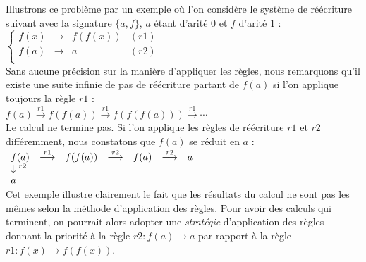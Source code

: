 Illustrons ce problème par un exemple où l'on considère le système de
réécriture suivant avec la signature $\{a,f\}$, $a$ étant d'arité 0 et $f$
d'arité 1 :\\
$\left\{\begin{array}{lclr}
  f(x) & \rightarrow & f(f(x)) & (r1)\\
  f(a) & \rightarrow & a & (r2)\\
  \end{array} \right. $\\
Sans aucune précision sur la manière d'appliquer les règles, nous remarquons
qu'il existe une suite infinie de pas de réécriture partant de $f(a)$ si l'on
applique toujours la règle $r1$ :\\
$f(a) \overset{r1}{\longrightarrow} f(f(a)) \overset{r1}{\longrightarrow}
f(f(f(a))) \overset{r1}{\longrightarrow} \cdots $\\
Le calcul ne termine pas. Si l'on applique les règles de réécriture $r1$ et $r2$
différemment, nous constatons que $f(a)$ se réduit en $a$ :\\
$\begin{array}{lllllll}
  f(a) & \overset{r1}{\longrightarrow} & f(f(a)) &
  \overset{r2}{\longrightarrow} & f(a) & \overset{r2}{\longrightarrow}& a\\
  \downarrow {\vspace{-1.0em}\footnotesize ^{r2}} &&&&&&\\
  a&&&&&&\\
\end{array}$\\
Cet exemple illustre clairement le fait que les résultats du calcul ne sont pas
les mêmes selon la méthode d'application des règles. Pour avoir des calculs qui
terminent, on pourrait alors adopter une \emph{stratégie} d'application des
règles donnant la priorité à la règle $r2 : f(a) \rightarrow a$ par rapport à
la règle $r1 : f(x) \rightarrow f(f(x))$.


